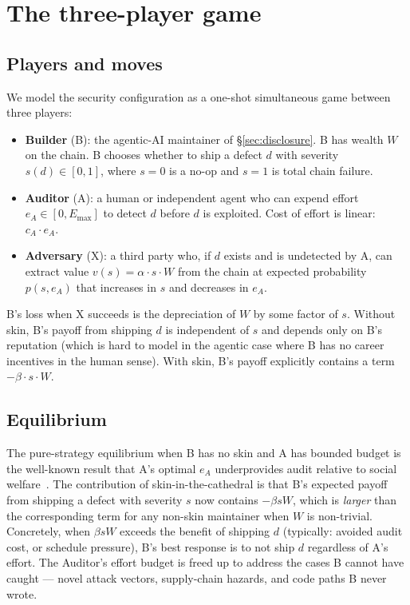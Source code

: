 \documentclass[11pt,a4paper]{article}
\begin{document}
\section{The three-player game}\label{sec:game}

\subsection{Players and moves}

We model the security configuration as a one-shot simultaneous game
between three players:
\begin{itemize}[leftmargin=2em]
  \item \textbf{Builder} (B): the agentic-AI maintainer of
  \S\ref{sec:disclosure}. B has wealth $W$ on the chain. B chooses
  whether to ship a defect $d$ with severity $s(d) \in [0, 1]$, where
  $s = 0$ is a no-op and $s = 1$ is total chain failure.
  \item \textbf{Auditor} (A): a human or independent agent who can
  expend effort $e_A \in [0, E_{\max}]$ to detect $d$ before $d$ is
  exploited. Cost of effort is linear: $c_A \cdot e_A$.
  \item \textbf{Adversary} (X): a third party who, if $d$ exists and
  is undetected by A, can extract value $v(s) = \alpha \cdot s \cdot W$
  from the chain at expected probability $p(s, e_A)$ that increases in
  $s$ and decreases in $e_A$.
\end{itemize}
B's loss when X succeeds is the depreciation of $W$ by some factor of
$s$. Without skin, B's payoff from shipping $d$ is independent of $s$
and depends only on B's reputation (which is hard to model in the
agentic case where B has no career incentives in the human sense).
With skin, B's payoff explicitly contains a term $-\beta \cdot s \cdot W$.

\subsection{Equilibrium}

The pure-strategy equilibrium when B has no skin and A has bounded
budget is the well-known result that A's optimal $e_A$ underprovides
audit relative to social welfare~\cite{olson1965}. The contribution
of skin-in-the-cathedral is that B's expected payoff from shipping a
defect with severity $s$ now contains $-\beta s W$, which is
\emph{larger} than the corresponding term for any non-skin maintainer
when $W$ is non-trivial. Concretely, when $\beta s W$ exceeds the
benefit of shipping $d$ (typically: avoided audit cost, or
schedule pressure), B's best response is to not ship $d$ regardless
of A's effort. The Auditor's effort budget is freed up to address the
cases B cannot have caught --- novel attack vectors, supply-chain
hazards, and code paths B never wrote.
\end{document}

